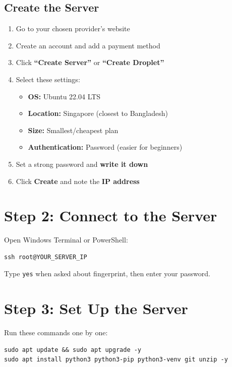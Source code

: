 \subsection{Create the Server}

\begin{enumerate}[leftmargin=1.5cm]
    \item Go to your chosen provider's website
    \item Create an account and add a payment method
    \item Click \textbf{``Create Server''} or \textbf{``Create Droplet''}
    \item Select these settings:
    \begin{itemize}
        \item \textbf{OS:} Ubuntu 22.04 LTS
        \item \textbf{Location:} Singapore (closest to Bangladesh)
        \item \textbf{Size:} Smallest/cheapest plan
        \item \textbf{Authentication:} Password (easier for beginners)
    \end{itemize}
    \item Set a strong password and \textbf{write it down}
    \item Click \textbf{Create} and note the \textbf{IP address}
\end{enumerate}

\section{Step 2: Connect to the Server}

Open Windows Terminal or PowerShell:

\begin{lstlisting}[style=termstyle]
ssh root@YOUR_SERVER_IP
\end{lstlisting}

Type \texttt{yes} when asked about fingerprint, then enter your password.

\section{Step 3: Set Up the Server}

Run these commands one by one:

\begin{lstlisting}[style=termstyle, title={Update and install Python}]
sudo apt update && sudo apt upgrade -y
sudo apt install python3 python3-pip python3-venv git unzip -y
\end{lstlisting}

